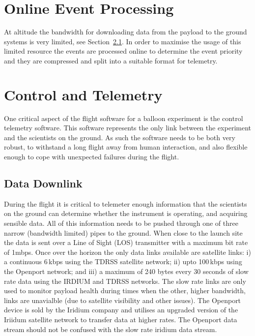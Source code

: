 \documentclass{article}
\begin{document}
\section{Online Event Processing}
At altitude the bandwidth for downloading data from the payload to the ground systems is very limited, see Section~\ref{s:datadown}. In order to maximise the usage of this limited resource the events are processed online to determine the event priority and they are compressed and split into a suitable format for telemetry. 


\section{Control and Telemetry}
One critical aspect of the flight software for a balloon experiment is the control telemetry software. This software represents the only link between the experiment and the scientists on the ground. As such the software needs to be both very robust, to withstand a long flight away from human interaction, and also flexible enough to cope with unexpected failures during the flight.

\subsection{Data Downlink} \label{s:datadown}
During the flight it is critical to telemeter enough information that the scientists on the ground can determine whether the instrument is operating, and acquiring sensible data. All of this information needs to be pushed through one of three narrow (bandwidth limited) pipes to the ground. When close to the launch site the data is sent over a Line of Sight (LOS) transmitter with a maximum bit rate of 1mbps. Once over the horizon the only data links available are satellite links: i) a continuous 6\,kbps using the TDRSS satellite network; ii) upto 100\,kbps using the Openport network; and iii) a maximum of 240 bytes every 30 seconds of slow rate data using the IRDIUM and TDRSS networks. The slow rate links are only used to monitor payload health during times when the other, higher bandwidth, links are unavialble (due to satellite visibility and other issues). The Openport device is sold by the Iridium company and utilises an upgraded version of the Iriidum satellite network to transfer data at higher rates. The Openport data stream should not be confused with the slow rate iridium data stream.
\end{document}
